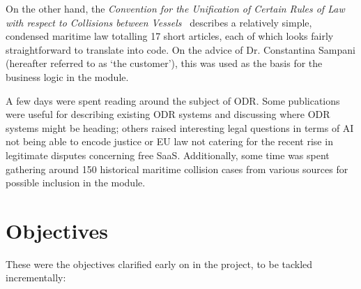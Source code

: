 On the other hand, the \emph{Convention for the Unification of Certain Rules of Law with respect to Collisions between Vessels}~\cite{law:short} describes a relatively simple, condensed maritime law totalling 17 short articles, each of which looks fairly straightforward to translate into code. On the advice of Dr. Constantina Sampani (hereafter referred to as `the customer'), this was used as the basis for the business logic in the module.

A few days were spent reading around the subject of ODR. Some publications were useful for describing existing ODR systems \cite{br:cyberMediation} and discussing where ODR systems might be heading; \cite{br:generations}  others raised interesting legal questions in terms of AI not being able to encode justice \cite{br:gameTheory} or EU law not catering for the recent rise in legitimate disputes concerning free SaaS. \cite{br:cloudComputing} Additionally, some time was spent gathering around 150 historical maritime collision cases from various sources for possible inclusion in the module. \cite{cases1}\cite{cases2}\cite{cases3}

\section{Objectives}

These were the objectives clarified early on in the project, to be tackled incrementally:

